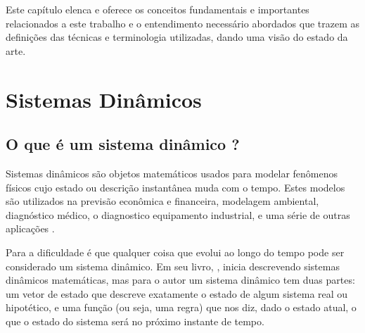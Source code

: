 Este capítulo elenca e oferece os conceitos fundamentais e importantes relacionados a este trabalho e o entendimento necessário abordados que trazem as definições das técnicas e terminologia utilizadas, dando uma visão do estado da arte.

\section{Sistemas Dinâmicos}
\subsection{O que é um sistema dinâmico ?}

Sistemas dinâmicos são objetos matemáticos usados para modelar fenômenos físicos cujo estado ou descrição instantânea muda com o tempo. Estes modelos são utilizados na previsão econômica e financeira, modelagem ambiental, diagnóstico médico, o diagnostico equipamento industrial, e uma série de outras aplicações \cite{Dean1991}.

Para \cite{Scheinerman1995} a dificuldade é que qualquer coisa que evolui ao longo do tempo pode ser considerado um sistema dinâmico. Em seu livro, \cite{Scheinerman1995},  inicia descrevendo sistemas dinâmicos matemáticas, mas para o autor um sistema dinâmico tem duas partes: um vetor de estado que descreve exatamente o estado de algum sistema real ou hipotético, e uma função (ou seja, uma regra) que nos diz, dado o estado atual, o que o estado do sistema será no próximo instante de tempo.



